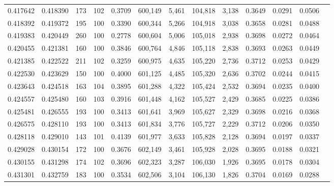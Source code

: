 \begin{tabular}{rrrrrrrrrrrrr}
0.417642 & 0.418390 &   173 & 102 &                                     0.3709 & 600,149 &   5,461 & 104,818 &   3,138 & 0.3649 & 0.0291 & 0.0506 \\
0.418392 & 0.419372 &   195 & 100 &                                     0.3390 & 600,344 &   5,266 & 104,918 &   3,038 & 0.3658 & 0.0281 & 0.0488 \\
0.419383 & 0.420449 &   260 & 100 &                                     0.2778 & 600,604 &   5,006 & 105,018 &   2,938 & 0.3698 & 0.0272 & 0.0464 \\
0.420455 & 0.421381 &   160 & 100 &                                     0.3846 & 600,764 &   4,846 & 105,118 &   2,838 & 0.3693 & 0.0263 & 0.0449 \\
0.421385 & 0.422522 &   211 & 102 &                                     0.3259 & 600,975 &   4,635 & 105,220 &   2,736 & 0.3712 & 0.0253 & 0.0429 \\
0.422530 & 0.423629 &   150 & 100 &                                     0.4000 & 601,125 &   4,485 & 105,320 &   2,636 & 0.3702 & 0.0244 & 0.0415 \\
0.423643 & 0.424518 &   163 & 104 &                                     0.3895 & 601,288 &   4,322 & 105,424 &   2,532 & 0.3694 & 0.0235 & 0.0400 \\
0.424557 & 0.425480 &   160 & 103 &                                     0.3916 & 601,448 &   4,162 & 105,527 &   2,429 & 0.3685 & 0.0225 & 0.0386 \\
0.425481 & 0.426555 &   193 & 100 &                                     0.3413 & 601,641 &   3,969 & 105,627 &   2,329 & 0.3698 & 0.0216 & 0.0368 \\
0.426575 & 0.428110 &   193 & 100 &                                     0.3413 & 601,834 &   3,776 & 105,727 &   2,229 & 0.3712 & 0.0206 & 0.0350 \\
0.428118 & 0.429010 &   143 & 101 &                                     0.4139 & 601,977 &   3,633 & 105,828 &   2,128 & 0.3694 & 0.0197 & 0.0337 \\
0.429028 & 0.430154 &   172 & 100 &                                     0.3676 & 602,149 &   3,461 & 105,928 &   2,028 & 0.3695 & 0.0188 & 0.0321 \\
0.430155 & 0.431298 &   174 & 102 &                                     0.3696 & 602,323 &   3,287 & 106,030 &   1,926 & 0.3695 & 0.0178 & 0.0304 \\
0.431301 & 0.432759 &   183 & 100 &                                     0.3534 & 602,506 &   3,104 & 106,130 &   1,826 & 0.3704 & 0.0169 & 0.0288 \\

\end{tabular}
